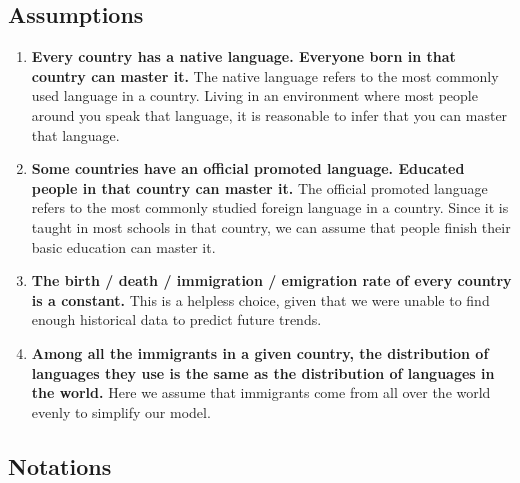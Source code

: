 \documentclass{mcmthesis}
\begin{document}
\subsection{Assumptions}\label{ssec:1}
\begin{enumerate}
    \item \textbf{Every country has a native language. Everyone born in that country can master it.} The native language refers to the most commonly used language in a country. Living in an environment where most people around you speak that language, it is reasonable to infer that you can master that language.
    \item \textbf{Some countries have an official promoted language. Educated people in that country can master it.} The official promoted language refers to the most commonly studied foreign language in a country. Since it is taught in most schools in that country, we can assume that people finish their basic education can master it.
    \item \textbf{The birth\cite{wiki:birth} / death\cite{wiki:death} / immigration\cite{wiki:im} / emigration\cite{wiki:em} rate of every country is a constant.} This is a helpless choice, given that we were unable to find enough historical data to predict future trends.
    \item \textbf{Among all the immigrants in a given country, the distribution of languages they use is the same as the distribution of languages in the world\cite{wiki:proportion}.} Here we assume that immigrants come from all over the world evenly to simplify our model.

\end{enumerate}
\subsection{Notations}
\end{document}
